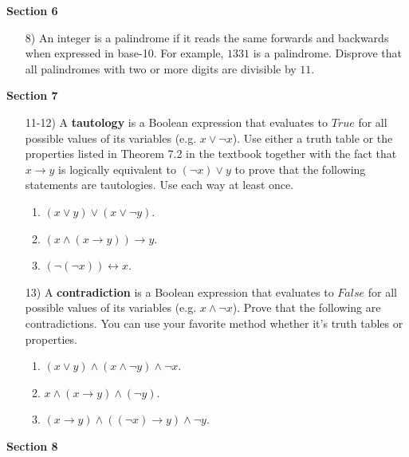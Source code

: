 \documentclass[11pt]{preprint}
\begin{document}
\textbf{Section 6}
\begin{enumerate}
\item[8)]An integer is a palindrome if it reads the same forwards and backwards when expressed in base-10. For example, $1331$ is a palindrome. Disprove that all palindromes with two or more digits are divisible by $11$.
\end{enumerate}

\newpage
\textbf{Section 7}
\begin{enumerate}
\item[11-12)] A \textbf{tautology} is a Boolean expression that evaluates to $True$ for all possible values of its variables (e.g. $x\vee\neg x$). Use either a truth table or the properties listed in Theorem 7.2 in the textbook together with the fact that $x\to y$ is logically equivalent to $(\neg x)\vee y$ to prove that the following statements are tautologies. Use each way at least once.
\begin{enumerate}
\item $(x\vee y)\vee (x\vee\neg y)$.
\item $(x\wedge(x\to y))\to y$.
\item $(\neg(\neg x))\leftrightarrow x$.
\end{enumerate}

\item[13)] A \textbf{contradiction} is a Boolean expression that evaluates to $False$ for all possible values of its variables (e.g.  $x\wedge\neg x$). Prove that the following are contradictions. You can use your favorite method whether it's truth tables or properties.
\begin{enumerate}
\item $(x\vee y)\wedge (x\wedge\neg y)\wedge\neg x$.
\item $x\wedge(x\to y)\wedge(\neg y)$.
\item $(x\to y)\wedge ((\neg x)\to y)\wedge \neg y$.
\end{enumerate}
\end{enumerate}

\textbf{Section 8}
\end{document}
